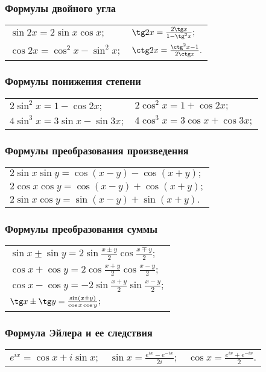 \subsubsection{Формулы двойного угла}
\begin{tabular}{ l l }
$\sin 2x = 2\sin x \cos x;$
&
$\tg 2x = \frac{2\tg x}{1-\tg^2x};$
\\
$\cos 2x = \cos^2 x - \sin^2 x;$
&
$\ctg 2x = \frac{\ctg^2x-1}{2\ctg x}.$
\end{tabular}

\subsubsection{Формулы понижения степени}
\begin{tabular}{ l l }
$2\sin^2x=1-\cos 2x;$
&
$2\cos^2x=1+\cos 2x;$
\\
$4\sin^3x=3\sin x-\sin 3x;$
&
$4\cos^3x=3\cos x+\cos 3x;$
\end{tabular}

\subsubsection{Формулы преобразования произведения}
\begin{tabular}{l}
$2\sin x \sin y = \cos (x-y)-\cos(x+y);$
\\
$2\cos x \cos y = \cos (x-y)+\cos(x+y);$
\\
$2\sin x \cos y = \sin (x-y)+\sin(x+y).$
\end{tabular}

\subsubsection{Формулы преобразования суммы}
\begin{tabular}{l}
$\sin x\pm \sin y =2 \sin \frac{x\pm y}{2} \cos \frac{x\mp y}{2};$
\\
$\cos x + \cos y  = 2 \cos \frac{x + y}{2} \cos \frac{x - y}{2};$
\\
$\cos x - \cos y  = -2 \sin \frac{x + y}{2} \sin\frac{x - y}{2};$
\\
$\tg x \pm \tg y = \frac{\sin (x \pm y)}{ \cos x \cos y};$
\end{tabular}
  
\subsubsection{Формула Эйлера и ее следствия}
\begin{tabular}{l l l}
$e^{ix} = \cos x + i \sin x;$
&
$\sin x = \frac{e^{ix}-e^{-ix}}{2i};$
&
$\cos x = \frac{e^{ix}+e^{-ix}}{2}.$
\end{tabular}

